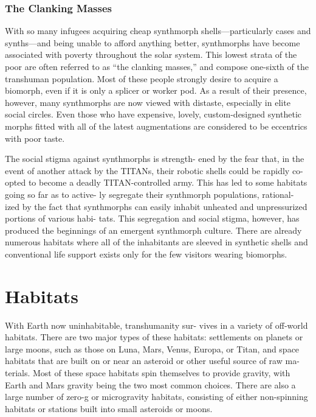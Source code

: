 \subsubsection{The Clanking Masses}

With so many infugees acquiring cheap synthmorph 
shells—particularly cases and synths—and being 
unable to afford anything better, synthmorphs have 
become associated with poverty throughout the solar 
system. This lowest strata of the poor are often referred 
to as ``the clanking masses,'' and compose one-sixth 
of the transhuman population. Most of these people 
strongly desire to acquire a biomorph, even if it is only 
a splicer or worker pod. As a result of their presence, 
however, many synthmorphs are now viewed with 
distaste, especially in elite social circles. Even those 
who have expensive, lovely, custom-designed synthetic 
morphs fitted with all of the latest augmentations are 
considered to be eccentrics with poor taste.

The social stigma against synthmorphs is strength-
ened by the fear that, in the event of another attack 
by the TITANs, their robotic shells could be rapidly 
co-opted to become a deadly TITAN-controlled army. 
This has led to some habitats going so far as to active-
ly segregate their synthmorph populations, rational-
ized by the fact that synthmorphs can easily inhabit 
unheated and unpressurized portions of various habi-
tats. This segregation and social stigma, however, has 
produced the beginnings of an emergent synthmorph 
culture. There are already numerous habitats where 
all of the inhabitants are sleeved in synthetic shells 
and conventional life support exists only for the few 
visitors wearing biomorphs.

\section{Habitats}

With Earth now uninhabitable, transhumanity sur-
vives in a variety of off-world habitats. There are two 
major types of these habitats: settlements on planets 
or large moons, such as those on Luna, Mars, Venus, 
Europa, or Titan, and space habitats that are built on 
or near an asteroid or other useful source of raw ma-
terials. Most of these space habitats spin themselves 
to provide gravity, with Earth and Mars gravity being 
the two most common choices. There are also a large 
number of zero-g or microgravity habitats, consisting 
of either non-spinning habitats or stations built into 
small asteroids or moons.

